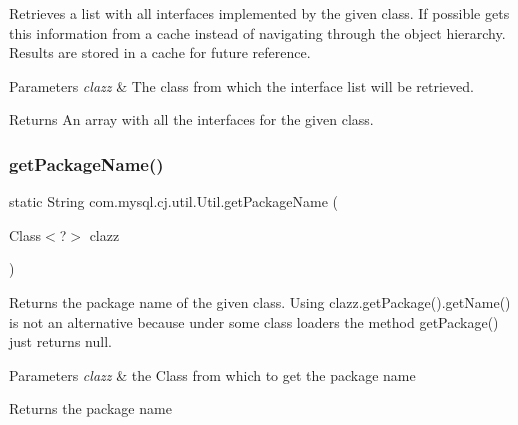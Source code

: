 Retrieves a list with all interfaces implemented by the given class. If possible gets this information from a cache instead of navigating through the object hierarchy. Results are stored in a cache for future reference.


\begin{DoxyParams}{Parameters}
{\em clazz} & The class from which the interface list will be retrieved. \\
\hline
\end{DoxyParams}
\begin{DoxyReturn}{Returns}
An array with all the interfaces for the given class. 
\end{DoxyReturn}
\mbox{\label{classcom_1_1mysql_1_1cj_1_1util_1_1_util_a142027940787b4d09dc21ea4c5de617e}} 
\subsubsection{\texorpdfstring{get\+Package\+Name()}{getPackageName()}}
{\footnotesize\ttfamily static String com.\+mysql.\+cj.\+util.\+Util.\+get\+Package\+Name (\begin{DoxyParamCaption}\item[{Class$<$?$>$}]{clazz }\end{DoxyParamCaption})\hspace{0.3cm}{\ttfamily [static]}}

Returns the package name of the given class. Using clazz.\+get\+Package().get\+Name() is not an alternative because under some class loaders the method get\+Package() just returns null.


\begin{DoxyParams}{Parameters}
{\em clazz} & the Class from which to get the package name \\
\hline
\end{DoxyParams}
\begin{DoxyReturn}{Returns}
the package name 
\end{DoxyReturn}
\mbox{\label{classcom_1_1mysql_1_1cj_1_1util_1_1_util_a6c3f08276e2a1f6721540f24e1996167}} 
